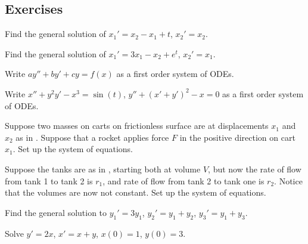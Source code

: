 \subsection{Exercises}

\begin{exercise}
Find the general solution of $x_1' = x_2 - x_1 + t$, $x_2' = x_2$.
\end{exercise}

\begin{exercise}
Find the general solution of $x_1' = 3 x_1 - x_2 + e^t$, $x_2' = x_1$.
\end{exercise}

\begin{exercise}
Write $ay'' + by' + cy = f(x)$
as a first order system of ODEs.
\end{exercise}

\begin{exercise}
Write $x'' + y^2 y' - x^3 = \sin(t)$, 
$y'' + {(x'+y')}^2 -x = 0$ as a first order system of ODEs.
\end{exercise}

\begin{exercise}
Suppose two masses on carts on frictionless surface are at 
displacements $x_1$ and $x_2$ as in .
Suppose that a rocket applies force $F$ in the positive direction on cart
$x_1$.  Set up the system of equations.
\end{exercise}

\begin{exercise}
Suppose the tanks are as in 
, starting both at volume $V$,
but now the rate of flow from tank 1 to tank 2 is $r_1$, and
rate of flow from tank 2 to tank one is $r_2$.
Notice that the volumes are now not constant.  Set up the system of equations.
\end{exercise}

\setcounter{exercise}{100}

\begin{exercise}
Find the general solution to $y_1' = 3 y_1$, $y_2' = y_1 + y_2$,
$y_3' = y_1 + y_3$.
\end{exercise}

\begin{exercise}
Solve $y'=2x$, $x'=x+y$, $x(0)=1$, $y(0)=3$.
\end{exercise}

